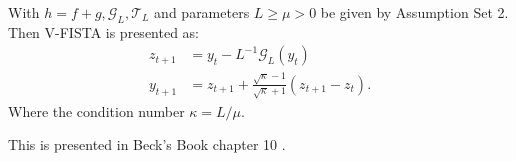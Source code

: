 \documentclass[12pt]{article}
\begin{document}
        \begin{definition}[V-FISTA]\label{def:v-fista}
            With $h = f + g, \mathcal G_L, \mathcal T_L$ and parameters $L \ge \mu > 0$  be given by Assumption Set 2. 
            Then V-FISTA is presented as: 
            \begin{align*}
                z_{t + 1} 
                &= y_t - L^{-1}\mathcal G_L(y_t)
                \\
                y_{t + 1} &= z_{t + 1} + 
                \frac{\sqrt{\kappa} - 1}{\sqrt{\kappa} + 1}
                (z_{t +1} - z_t). 
            \end{align*}
            Where the condition number $\kappa = L/\mu$. 
        \end{definition}
        \begin{remark}
            This is presented in Beck's Book chapter 10 \cite[(10.7.7)]{beck_first-order_2017}. 
        \end{remark}
\end{document}
